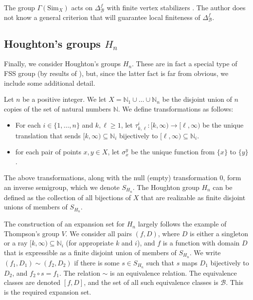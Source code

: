 \documentclass{amsart}
\newtheorem{standing assumption}[theorem]{Standing Assumption}
\begin{document}
The group
$\Gamma(\mathrm{Sim}_{X})$ acts on $\Delta^{f}_{\mathcal{B}}$ with finite vertex stabilizers \cite{Farley, FH2}. The author does not know a general criterion that will guarantee local finiteness of
$\Delta^{f}_{\mathcal{B}}$.

\subsection{Houghton's groups $H_{n}$}
Finally, we consider Houghton's groups $H_{n}$. These are in fact a special type of FSS group (by results of \cite{FHBraided}), but, since the latter fact is far from obvious, we include some additional detail.
 
Let $n$ be a positive integer. We let $X = \mathbb{N}_{1} \cup \ldots \cup \mathbb{N}_{n}$
be the disjoint union of $n$ copies of the set of natural numbers $\mathbb{N}$. We define transformations 
as follows:
\begin{itemize}
\item For each $i \in \{ 1, \ldots, n \}$ and $k,\ell \geq 1$, let
$\tau^{i}_{k,\ell}: [k, \infty) \rightarrow [\ell, \infty)$ be the unique translation that 
sends $[k, \infty) \subseteq \mathbb{N}_{i}$ bijectively to $[\ell, \infty) \subseteq \mathbb{N}_{i}$.
\item for each pair of points $x, y \in X$, let $\sigma_{x}^{y}$ be the unique function
from $\{ x \}$ to $\{ y \}$.
\end{itemize}
The above transformations, along with the null (empty) transformation $0$, form an inverse semigroup, which we denote $S_{H_{n}}$. The Houghton group $H_{n}$ can be defined as the collection of all bijections of $X$ that are realizable as finite disjoint unions of members of $S_{H_{n}}$. 

The construction of an expansion set for $H_{n}$ largely follows the example of Thompson's group $V$.
We consider all pairs $(f,D)$, where $D$ is either a singleton or a ray $[k,\infty) \subseteq \mathbb{N}_{i}$ (for appropriate $k$ and $i$), and $f$ is a function with domain $D$ that is expressible as a finite disjoint union of members of $S_{H_{n}}$. We write $(f_{1}, D_{1}) \sim (f_{2}, D_{2})$ if there is some
$s \in S_{H_{n}}$ such that $s$ maps $D_{1}$ bijectively to $D_{2}$, and $f_{2} \circ s = f_{1}$. The relation $\sim$ is an equivalence relation. The equivalence classes are denoted $[f,D]$, and the set of all such equivalence classes is $\mathcal{B}$. This is the required expansion set.
\end{document}
